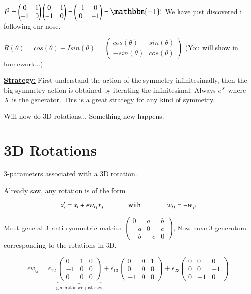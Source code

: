 {$I^2 =  \IMatrix\IMatrix = {\begin{pmatrix} -1 &  0  \\ 0  & -1 \end{pmatrix}} = \mathlarger{\mathlarger{\mathbbm{-1}}} ! $
We have just discovered i following our nose.

$R(\theta) = cos(\theta) + Isin(\theta) = {\begin{pmatrix} cos(\theta) &  sin(\theta)  \\ -sin(\theta)  & cos(\theta) \end{pmatrix}}$  (You will show in homework...)

\textbf{\underline{Strategy:}} First understand the action of the symmetry infinitesimally, then the big symmetry action is obtained by iterating the infinitesimal.
Always $e^X$ where $X$ is the generator. 
This is a great strategy for any kind of symmetry.

Will now do 3D rotations... Something new happens.

\section*{3D Rotations}

3-parameters associated with a 3D rotation.

Already saw, any rotation is of the form 

\begin{equation*}
x'_{i} = x_i + \epsilon w_{ij} x_j  \hspace{0.5in} \textrm{with } \hspace{0.5in} w_{ij} =- w_{ji}
\end{equation*}


Most general $3\time3$ anti-symmetric matrix: ${\begin{pmatrix} 0 & a & b  \\ -a & 0 & c \\ -b & -c & 0 \end{pmatrix}}$,  Now have 3 generators corresponding to the rotations in 3D.

\begin{equation*}
\epsilon w_{ij} = \epsilon_{12}\underbrace{{\begin{pmatrix} 0 & 1 & 0  \\ -1 & 0 & 0 \\ 0 & 0 & 0 \end{pmatrix}}}_{\text{generator we just saw}} + 
                  \epsilon_{13}{\begin{pmatrix} 0 & 0 & 1  \\ 0 & 0 & 0 \\ -1 & 0 & 0 \end{pmatrix}} +
                  \epsilon_{23}{\begin{pmatrix} 0 & 0 & 0  \\ 0 & 0 & -1 \\ 0 & -1 & 0 \end{pmatrix}}
\end{equation*}

}
